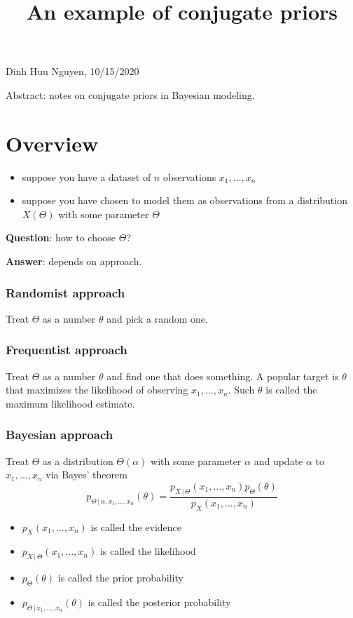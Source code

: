 \documentclass[14pt, reqno]{amsart}
\title{An example of conjugate priors}
\theoremstyle{definition}
\begin{document}
\maketitle

\begin{center}
Dinh Huu Nguyen, 10/15/2020
\end{center}
\vspace{20pt}

Abstract: notes on conjugate priors in Bayesian modeling.

\tableofcontents

\part{Overview}
\begin{itemize}
\item suppose you have a dataset of $n$ observations $x_1, \dots, x_n$
\item suppose you have chosen to model them as observations from a distribution $X(\Theta)$ with some parameter $\Theta$
\end{itemize}

\textbf{Question}: how to choose $\Theta$?

\textbf{Answer}: depends on approach.

\section{Randomist approach} Treat $\Theta$ as a number $\theta$ and pick a random one.

\section{Frequentist approach} Treat $\Theta$ as a number $\theta$ and find one that does something. A popular target is $\theta$ that maximizes the likelihood of observing $x_1, \dots, x_n$. Such $\theta$ is called the maximum likelihood estimate.

\section{Bayesian approach} \label{bayesian_approach} Treat $\Theta$ as a distribution $\Theta(\alpha)$ with some parameter $\alpha$ and update $\alpha$ to $x_1, \dots, x_n$ via Bayes' theorem
\begin{equation}\label{bayes_theorem}
p_{\Theta \,|\, \alpha, x_1, \dots, x_n}(\theta) = \frac{p_{X \,|\, \Theta}(x_1, \dots, x_n) p_{\Theta}(\theta)}{p_X(x_1, \dots, x_n)}
\end{equation}
\begin{itemize}
\item $p_X(x_1, \dots, x_n)$ is called the evidence
\item $p_{X \,|\, \Theta}(x_1, \dots, x_n)$ is called the likelihood
\item $ p_{\Theta}(\theta)$ is called the prior probability
\item $p_{\Theta \,|\, x_1, \dots, x_n}(\theta)$ is called the posterior probability
\end{itemize}
\end{document}
